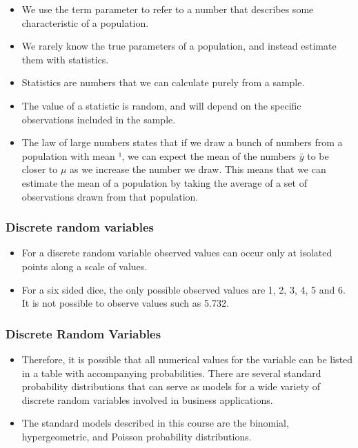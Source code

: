 \documentclass{beamer}
\begin{document}
\begin{frame}
\Large
\begin{itemize}
\item We use the term parameter to refer to a number that describes some characteristic of a population. \item  We
rarely know the true parameters of a population, and instead estimate them with statistics. \item Statistics
are numbers that we can calculate purely from a sample. \item The value of a statistic is random, and will
depend on the specific observations included in the sample.
\end{itemize}
\end{frame}
\begin{frame}
\begin{itemize}
\item The law of large numbers states that if we draw a bunch of numbers from a population with mean ¹,
we can expect the mean of the numbers $\bar{y}$ to be closer to $\mu$ as we increase the number we draw. This
means that we can estimate the mean of a population by taking the average of a set of observations
drawn from that population.
\end{itemize}
\end{frame}
\begin{frame}
\frametitle{Discrete random variables}
\begin{itemize}
\item For a discrete random variable observed values can occur only at isolated points along a scale of values. \item For a six sided dice, the only possible observed values are 1, 2, 3, 4, 5 and 6. It is not possible to observe values such as 5.732.
\end{itemize}
\end{frame}
\begin{frame}
\frametitle{Discrete Random Variables}
\Large
\vspace{-1cm}
\begin{itemize}
\item Therefore, it is possible that all numerical values for the variable can be listed in a table with accompanying
probabilities. There are several standard probability distributions that can serve as models for a wide variety of discrete random variables involved in business applications. \item  The standard models described in this course are
the binomial, hypergeometric, and Poisson probability distributions.
\end{itemize}
\end{frame}
\end{document}
